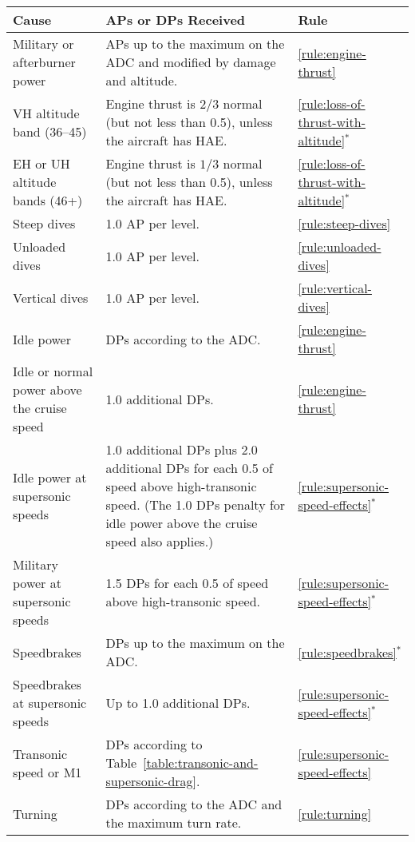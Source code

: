 {\begin{twocolumntable}[tp]


\begin{tabularx}{0.9\linewidth}{LLl}
\toprule
Cause&APs or DPs Received&Rule\\
\midrule
\addlinespace
\raggedright
Military or afterburner power&APs up to the maximum on the ADC and modified by damage and altitude.&\mbox{\ref{rule:engine-thrust}}\\
VH altitude band (36--45)&Engine thrust is $2/3$ normal (but not less than 0.5), unless the aircraft has HAE.&\mbox{\ref{rule:loss-of-thrust-with-altitude}$^*$}\\
EH or UH altitude bands (46+)&Engine thrust is $1/3$ normal (but not less than 0.5), unless the aircraft has HAE.&\mbox{\ref{rule:loss-of-thrust-with-altitude}$^*$}\\
\addlinespace
Steep dives&1.0 AP per level.&\mbox{\ref{rule:steep-dives}}\\
Unloaded dives&1.0 AP per level.&\mbox{\ref{rule:unloaded-dives}}\\
Vertical dives&1.0 AP per level.&\mbox{\ref{rule:vertical-dives}}\\
\addlinespace
\midrule
\addlinespace
Idle power&DPs according to the ADC.&\mbox{\ref{rule:engine-thrust}}\\
Idle or normal power above the cruise speed&1.0 additional DPs.&\mbox{\ref{rule:engine-thrust}}\\
Idle power at supersonic speeds&1.0 additional DPs plus 2.0 additional DPs for each 0.5 of speed above high-transonic speed. (The 1.0 DPs penalty for idle power above the cruise speed also applies.)&\mbox{\ref{rule:supersonic-speed-effects}$^*$}\\
Military power at supersonic speeds&1.5 DPs for each 0.5 of speed above high-transonic speed.&\mbox{\ref{rule:supersonic-speed-effects}$^*$}\\
\addlinespace
Speedbrakes& DPs up to the maximum on the ADC.&\mbox{\ref{rule:speedbrakes}$^*$}\\
Speedbrakes at supersonic speeds&Up to 1.0 additional DPs.&\mbox{\ref{rule:supersonic-speed-effects}$^*$}\\
\addlinespace
Transonic speed or M1&DPs according to Table~\ref{table:transonic-and-supersonic-drag}.&\ref{rule:supersonic-speed-effects}\\
\addlinespace
Turning&DPs according to the ADC and the maximum turn rate.&\mbox{\ref{rule:turning}}\\

\end{tabularx}
\end{twocolumntable}}
